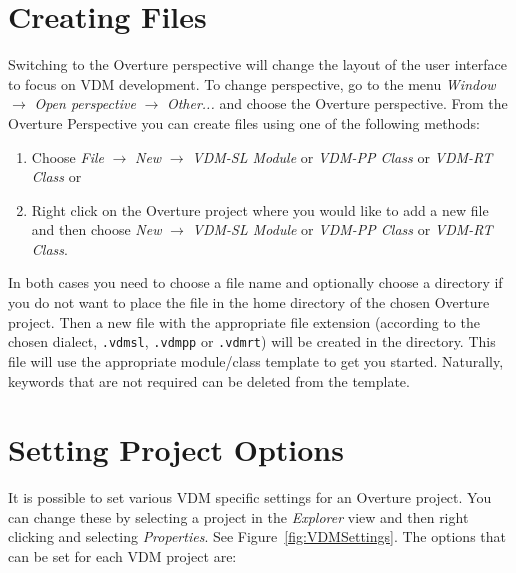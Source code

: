 \documentclass{overturerepchap}
\begin{document}

\section{Creating Files}

Switching to the Overture perspective will change the layout of the user
interface to focus on VDM development. To change perspective, go to the menu 
\emph{Window} $\rightarrow$ \emph{Open perspective} $\rightarrow$
\emph{Other...} and choose the Overture perspective.
From the Overture Perspective you can create files
using one of the following methods:

\begin{enumerate}
  \item Choose \emph{File} $\rightarrow$ \emph{New} $\rightarrow$
    \emph{VDM-SL Module} or 
    \emph{VDM-PP Class} or 
    \emph{VDM-RT Class} or
  \item Right click on the Overture project where you would like to
    add a new file and then choose \emph{New} $\rightarrow$ 
    \emph{VDM-SL Module} or \emph{VDM-PP Class} or \emph{VDM-RT Class}.
\end{enumerate}

In both cases you need to choose a file name and optionally choose a
directory if you do not want to place the file in the home directory of
the chosen Overture project. Then a new file with the appropriate file
extension (according to the chosen dialect, \texttt{.vdmsl},
\texttt{.vdmpp} or \texttt{.vdmrt}) will be
created in the directory. This file will use the appropriate
module/class template to get you started. Naturally, keywords 
that are not required can be deleted from the template.

\section{Setting Project Options}\label{subsec:options}

It is possible to set various VDM
specific settings for an Overture project. You can change these by selecting a project
in the \emph{Explorer} view and then right clicking and selecting
\emph{Properties}. See Figure~\ref{fig:VDMSettings}. The options 
that can be set for each VDM project are:
\end{document}
